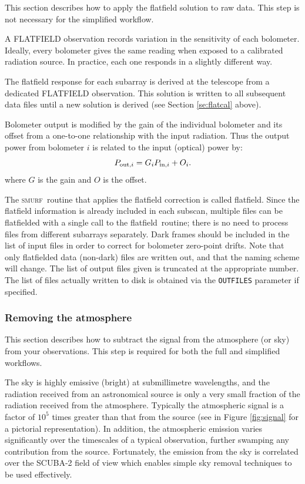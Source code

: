 \documentclass[twoside,11pt]{article}
\newcommand{\xref}[3]{#1}
\newcommand{\xlabel}[1]{}
\renewcommand{\_}{\texttt{\symbol{95}}}
\newcommand{\SMURF}{\textsc{smurf}}
\newcommand{\task}[1]{\textsf{#1}}
\newcommand{\flatfield}{\xref{\task{flatfield}}{sun258}{FLATFIELD}}
\begin{document}
This section describes how to apply the flatfield solution to raw
data. This step is not necessary for the simplified workflow.

A FLATFIELD observation records variation in the sensitivity of each
bolometer. Ideally, every bolometer gives the same reading when
exposed to a calibrated radiation source. In practice, each one
responds in a slightly different way.

The flatfield response for each subarray is derived at the telescope
from a dedicated FLATFIELD observation. This solution is written to
all subsequent data files until a new solution is derived (see Section
\ref{se:flatcal} above).

Bolometer output is modified by the gain of the individual bolometer
and its offset from a one-to-one relationship with the input
radiation. Thus the output power from bolometer $i$ is related to the
input (optical) power by:
\begin{equation}
P_{{\rm out},i} = G_i P_{{\rm in},i} + O_i.
\end{equation}
where $G$ is the gain and $O$ is the offset.

The \SMURF\ routine that applies the flatfield correction is called
\flatfield. Since the flatfield information is already included in
each subscan, multiple files can be flatfielded with a single call to
the \flatfield\ routine; there is no need to process files from
different subarrays separately. Dark frames should be included in the
list of input files in order to correct for bolometer zero-point
drifts. Note that only flatfielded data (non-dark) files are written
out, and that the naming scheme will change. The list of output files
given is truncated at the appropriate number. The list of files
actually written to disk is obtained via the \texttt{OUTFILES}
parameter if specified.

\subsubsection{\xlabel{skysub}Removing the atmosphere\label{se:skysub}}

This section describes how to subtract the signal from the atmosphere
(or sky) from your observations. This step is required for both the
full and simplified workflows.

The sky is highly emissive (bright) at submillimetre wavelengths, and
the radiation received from an astronomical source is only a very
small fraction of the radiation received from the
atmosphere. Typically the atmospheric signal is a factor of $10^5$
times greater than that from the source (see in Figure
\ref{fig:signal} for a pictorial representation). In addition, the
atmospheric emission varies significantly over the timescales of a
typical observation, further swamping any contribution from the
source. Fortunately, the emission from the sky is correlated over the
SCUBA-2 field of view which enables simple sky removal techniques to
be used effectively.
\end{document}
